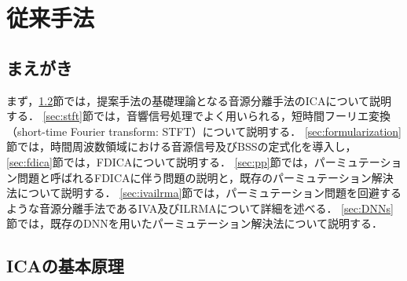 \chapter{従来手法}
\label{chap:conv}

\section{まえがき}
まず，\ref{sec:ica}節では，提案手法の基礎理論となる音源分離手法のICAについて説明する．
\ref{sec:stft}節では，音響信号処理でよく用いられる，短時間フーリエ変換（short-time Fourier transform: STFT）について説明する．
\ref{sec:formularization}節では，時間周波数領域における音源信号及びBSSの定式化を導入し，
\ref{sec:fdica}節では，FDICAについて説明する．
\ref{sec:pp}節では，パーミュテーション問題と呼ばれるFDICAに伴う問題の説明と，既存のパーミュテーション解決法について説明する．
\ref{sec:ivailrma}節では，パーミュテーション問題を回避するような音源分離手法であるIVA及びILRMAについて詳細を述べる．
\ref{sec:DNNs}節では，既存のDNNを用いたパーミュテーション解決法について説明する．

\section{ICAの基本原理}
\label{sec:ica}

